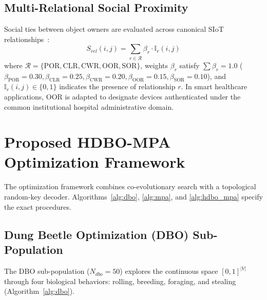 \documentclass[journal,compsoc]{IEEEtran}
\begin{document}
\subsection{Multi-Relational Social Proximity}
Social ties between object owners are evaluated across canonical SIoT relationships~\cite{rad2020social}:
\begin{equation}
S_{rel}(i,j) = \sum_{r \in \mathcal{R}} \beta_r \cdot \mathbb{I}_r(i,j)
\end{equation}
where $\mathcal{R} = \{\text{POR}, \text{CLR}, \text{CWR}, \text{OOR}, \text{SOR}\}$, weights $\beta_r$ satisfy $\sum \beta_r = 1.0$ ($\beta_{\text{POR}}=0.30, \beta_{\text{CLR}}=0.25, \beta_{\text{CWR}}=0.20, \beta_{\text{OOR}}=0.15, \beta_{\text{SOR}}=0.10$), and $\mathbb{I}_r(i,j) \in \{0, 1\}$ indicates the presence of relationship $r$. In smart healthcare applications, OOR is adapted to designate devices authenticated under the common institutional hospital administrative domain.

\section{Proposed HDBO-MPA Optimization Framework}
The optimization framework combines co-evolutionary search with a topological random-key decoder. Algorithms~\ref{alg:dbo}, \ref{alg:mpa}, and \ref{alg:hdbo_mpa} specify the exact procedures.

\subsection{Dung Beetle Optimization (DBO) Sub-Population}
The DBO sub-population ($N_{dbo} = 50$) explores the continuous space $[0, 1]^{|V|}$ through four biological behaviors: rolling, breeding, foraging, and stealing (Algorithm~\ref{alg:dbo}).
\end{document}
